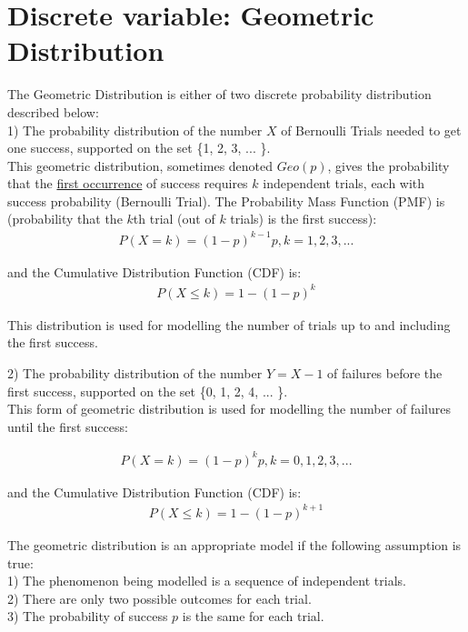 \section{Discrete variable: Geometric Distribution}

The Geometric Distribution is either of two discrete probability distribution described below: \\

1) The probability distribution of the number $X$ of Bernoulli Trials needed to get one success, supported on the set \{1, 2, 3, ... \}. \\

This geometric distribution, sometimes denoted $Geo(p)$, gives the probability that the \underline{first occurrence} of success requires $k$ independent trials, each with success probability (Bernoulli Trial). The Probability Mass Function (PMF) is (probability that the $k$th trial (out of $k$ trials) is the first success):\\
\begin{eqnarray}
P(X=k) = (1 - p)^{k-1} p, k=1,2,3,...
\label{geo_pmf_1}
\end{eqnarray}

and the Cumulative Distribution Function (CDF) is:\\
\begin{eqnarray}
P(X \le k) = 1 - (1-p)^k
\label{geo_cdf_1}
\end{eqnarray}

This distribution is used for modelling the number of trials up to and including the first success.

2) The probability distribution of the number $Y = X - 1$ of failures before the first success, supported on the set \{0, 1, 2, 4, ... \}. \\

This form of geometric distribution is used for modelling the number of failures until the first success:

\begin{eqnarray}
P(X=k) = (1 - p)^k p, k=0,1,2,3,...
\label{geo_pmf_2}
\end{eqnarray}

and the Cumulative Distribution Function (CDF) is:\\
\begin{eqnarray}
P(X \le k) = 1 - (1-p)^{k+1}
\label{geo_cdf_2}
\end{eqnarray}

The geometric distribution is an appropriate model if the following assumption is true:\\
1) The phenomenon being  modelled is a sequence of independent trials.\\
2) There are only two possible outcomes for each trial. \\
3) The probability of success $p$ is the same for each trial.\\

